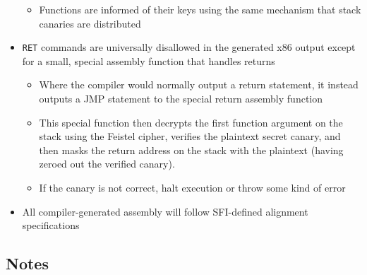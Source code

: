 \documentclass[12pt]{article}
\begin{document}
\begin{itemize}
\begin{itemize}
		\item Functions are informed of their keys using the same mechanism that stack canaries are distributed
	\end{itemize}
	\item \texttt{RET} commands are universally disallowed in the generated x86 output except for a small, special assembly function that handles returns
	\begin{itemize}
		\item Where the compiler would normally output a return statement, it instead outputs a JMP statement to the special return assembly function
		\item This special function then decrypts the first function argument on the stack using the Feistel cipher, verifies the plaintext secret canary, and then masks the return address on the stack with the plaintext (having zeroed out the verified canary).
		\item If the canary is not correct, halt execution or throw some kind of error
	\end{itemize}
	\item All compiler-generated assembly will follow SFI-defined alignment specifications

\end{itemize}

\subsection{Notes}
\end{document}
